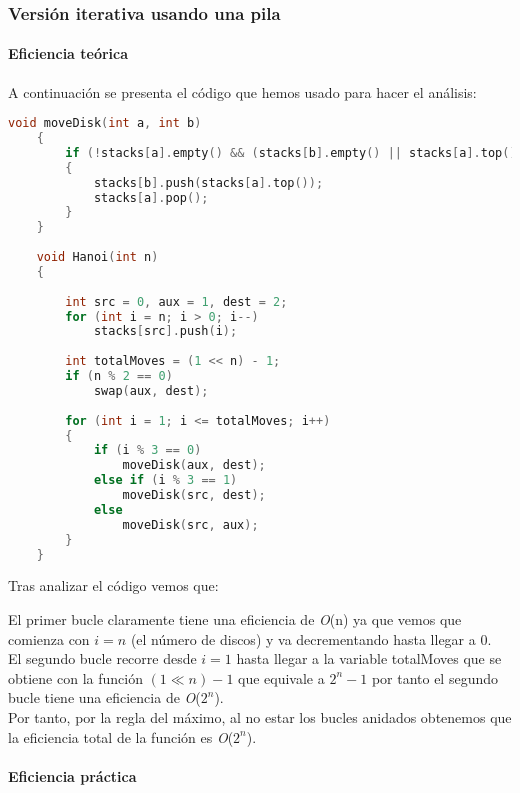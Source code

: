 \documentclass[a4paper,12pt]{article} %
\begin{document}
\subsubsection{Versión iterativa usando una pila}

\paragraph{Eficiencia teórica}

A continuación se presenta el código que hemos usado para hacer el análisis:

\begin{lstlisting}[language=C, caption={Código de Hanoi Iterativo con pila}]
	void moveDisk(int a, int b)
	{
		if (!stacks[a].empty() && (stacks[b].empty() || stacks[a].top() < stacks[b].top()))
		{
			stacks[b].push(stacks[a].top());
			stacks[a].pop();
		}
	}
	 
	void Hanoi(int n)
	{
	 
		int src = 0, aux = 1, dest = 2;
		for (int i = n; i > 0; i--)
			stacks[src].push(i);
	 
		int totalMoves = (1 << n) - 1;
		if (n % 2 == 0)
			swap(aux, dest);
	 
		for (int i = 1; i <= totalMoves; i++)
		{
			if (i % 3 == 0)
				moveDisk(aux, dest);
			else if (i % 3 == 1)
				moveDisk(src, dest);
			else
				moveDisk(src, aux);
		}
	}
\end{lstlisting}

Tras analizar el código vemos que:

El primer bucle claramente tiene una eficiencia de \textit{O}(n) ya que vemos que comienza con $i=n$ (el número de discos)
y va decrementando hasta llegar a 0.\\

El segundo bucle recorre desde $i=1$ hasta llegar a la variable totalMoves que se obtiene con la función 
$(1 \ll n) - 1$ que equivale a $2^n - 1$ por tanto el segundo bucle tiene una eficiencia de \textit{O}($2^n$).\\

Por tanto, por la regla del máximo, al no estar los bucles anidados obtenemos que la eficiencia total de la función es \textit{O}($2^n$).\\

\paragraph{Eficiencia práctica}
\end{document}
